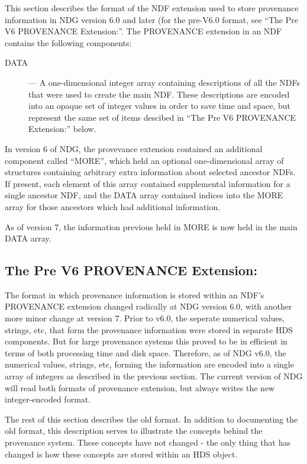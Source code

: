\documentclass[twoside,11pt]{article}
\renewcommand{\_}{\texttt{\symbol{95}}}
\begin{document}
This section describes the format of the NDF extension used to
store provenance information in NDG version 6.0 and later (for the
pre-V6.0 format, see ``The Pre V6 PROVENANCE Extension:''. The
PROVENANCE extension in an NDF contains the following components:

\begin{description}

\item [DATA] --- A one-dimensional integer array containing descriptions
of all the NDFs that were used to create the main NDF. These descriptions
are encoded into an opaque set of integer values in order to save time
and space, but represent the same set of items descibed in ``The Pre V6
PROVENANCE Extension:'' below.

\end{description}

In version 6 of NDG, the provevance extension contained an additional
component called ``MORE'', which held an optional one-dimensional array
of structures containing arbitrary extra information about selected
ancestor NDFs. If present, each element of this array contained
supplemental information for a single ancestor NDF, and the DATA array
contained indices into the MORE array for those ancestors which had
additional information.

As of version 7, the information previous held in MORE is now held in the
main DATA array.


\subsection{The Pre V6 PROVENANCE Extension:}

The format in which provenance information is stored within an NDF's
PROVENANCE extension changed radically at NDG version 6.0, with another
more minor change at version 7. Prior to v6.0,
the seperate numerical values, strings, etc, that form the provenance
information were stored in separate HDS components. But for large
provenance systems this proved to be in efficient in terms of both
processing time and disk space. Therefore, as of NDG v6.0, the numerical
values, strings, etc, forming the information are encoded into a single
array of integers as described in the previous section. The current
version of NDG will read both formats of provenance extension, but always
writes the new integer-encoded format.

The rest of this section describes the old format. In addition to
documenting the old format, this description serves to illustrate the
concepts behind the provenance system. These concepts have not changed -
the only thing that has changed is how these concepts are stored within
an HDS object.
\end{document}
